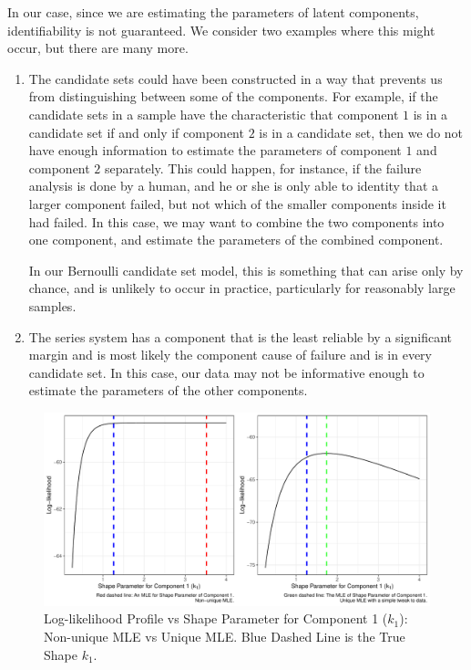 \documentclass[
]{article}
\begin{document}
In our case, since we are estimating the parameters of latent
components, identifiability is not guaranteed. We consider two examples
where this might occur, but there are many more.

\begin{enumerate}
\def\labelenumi{\arabic{enumi}.}
\item
  The candidate sets could have been constructed in a way that prevents
  us from distinguishing between some of the components. For example, if
  the candidate sets in a sample have the characteristic that component
  \(1\) is in a candidate set if and only if component \(2\) is in a
  candidate set, then we do not have enough information to estimate the
  parameters of component \(1\) and component \(2\) separately. This
  could happen, for instance, if the failure analysis is done by a
  human, and he or she is only able to identity that a larger component
  failed, but not which of the smaller components inside it had failed.
  In this case, we may want to combine the two components into one
  component, and estimate the parameters of the combined component.

  In our Bernoulli candidate set model, this is something that can arise
  only by chance, and is unlikely to occur in practice, particularly for
  reasonably large samples.
\item
  The series system has a component that is the least reliable by a
  significant margin and is most likely the component cause of failure
  and is in every candidate set. In this case, our data may not be
  informative enough to estimate the parameters of the other components.
\end{enumerate}

\begin{figure}

{\centering \includegraphics{image/test-flat-likelihood} 

}

\caption{Log-likelihood Profile vs Shape Parameter for Component 1 ($k_1$): Non-unique MLE vs Unique MLE.
Blue Dashed Line is the True Shape $k_1$.}\label{fig:flat-loglike-prof}
\end{figure}
\end{document}
